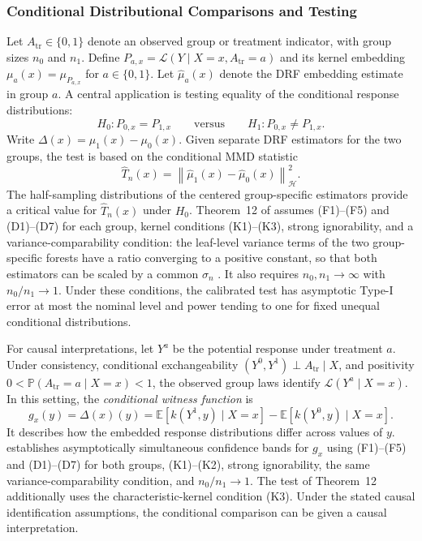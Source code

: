 \documentclass[12pt,a4paper]{article}
\newcommand{\E}{\mathbb E}
\newcommand{\Pp}{\mathbb P}
\newcommand{\calH}{\mathcal H}
\newcommand{\1}{\mathbf 1}
\newcommand{\norm}[1]{\left\lVert#1\right\rVert}
\begin{document}
\subsubsection{Conditional Distributional Comparisons and Testing}
Let $A_{\mathrm{tr}}\in\{0,1\}$ denote an observed group or treatment indicator, with group sizes $n_0$ and $n_1$. Define $P_{a,x}=\mathcal L(Y\mid X=x,A_{\mathrm{tr}}=a)$ and its kernel embedding $\mu_a(x)=\mu_{P_{a,x}}$ for $a\in\{0,1\}$. Let $\widehat\mu_a(x)$ denote the DRF embedding estimate in group $a$. A central application is testing equality of the conditional response distributions:
\begin{equation}\label{eq:twosample}
 H_0:P_{0,x}=P_{1,x}\qquad\text{versus}\qquad H_1:P_{0,x}\ne P_{1,x}.
\end{equation}
Write $\Delta(x)=\mu_1(x)-\mu_0(x)$. Given separate DRF estimators for the two groups, the test is based on the conditional MMD statistic
\begin{equation}\label{eq:conditionaltest}
 \widehat T_n(x)=
 \norm{\widehat\mu_1(x)-\widehat\mu_0(x)}_{\calH}^2.
\end{equation}
The half-sampling distributions of the centered group-specific estimators provide a critical value for $\widehat T_n(x)$ under $H_0$. Theorem~12 of \cite{naf2023} assumes (F1)--(F5) and (D1)--(D7) for each group, kernel conditions (K1)--(K3), strong ignorability, and a variance-comparability condition: the leaf-level variance terms of the two group-specific forests have a ratio converging to a positive constant, so that both estimators can be scaled by a common $\sigma_n$ \cite[Eq.~(30)]{naf2023}. It also requires $n_0,n_1\to\infty$ with $n_0/n_1\to1$. Under these conditions, the calibrated test has asymptotic Type-I error at most the nominal level and power tending to one for fixed unequal conditional distributions.

For causal interpretations, let $Y^a$ be the potential response under treatment $a$. Under consistency, conditional exchangeability $(Y^0,Y^1)\perp A_{\mathrm{tr}}\mid X$, and positivity $0<\Pp(A_{\mathrm{tr}}=a\mid X=x)<1$, the observed group laws identify $\mathcal L(Y^a\mid X=x)$. In this setting, the \emph{conditional witness function} is
\begin{equation}\label{eq:witness}
 g_x(y)=\Delta(x)(y)
 =\E[k(Y^1,y)\mid X=x]-\E[k(Y^0,y)\mid X=x].
\end{equation}
It describes how the embedded response distributions differ across values of $y$. \cite[Theorem~13]{naf2023} establishes asymptotically simultaneous confidence bands for $g_x$ using (F1)--(F5) and (D1)--(D7) for both groups, (K1)--(K2), strong ignorability, the same variance-comparability condition, and $n_0/n_1\to1$. The test of Theorem~12 additionally uses the characteristic-kernel condition (K3). Under the stated causal identification assumptions, the conditional comparison can be given a causal interpretation.
\end{document}

